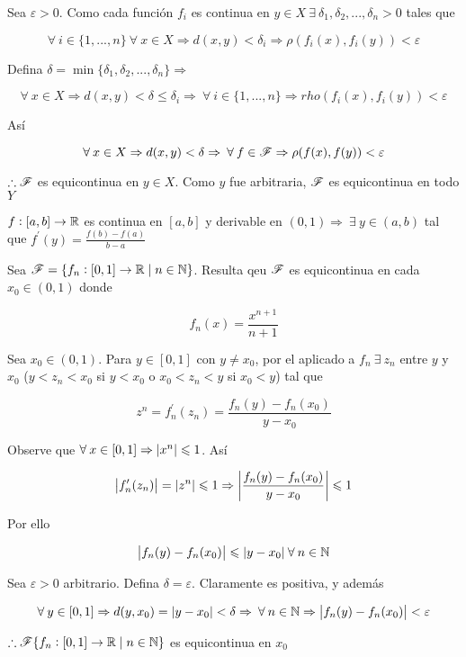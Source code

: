 \begin{proofexplanation}
    Sea $\varepsilon > 0$. Como cada función $f_i$ es continua en $ y \in X \: \exists \: \delta_1, \delta_2, ..., \delta_n > 0$ tales que

    $$\forall \: i \in \{ 1, ..., n \} \: \forall \: x \in X \Rightarrow d(x,y) < \delta_i \Rightarrow \rho(f_i(x),f_i(y)) < \varepsilon$$

    Defina $\delta = \min \{ \delta_1, \delta_2, ..., \delta_n \} \Rightarrow$

    $$\forall \: x \in X \Rightarrow d(x,y) < \delta \leqslant \delta_i \Rightarrow \: \forall \: i \in \{ 1, ..., n \} \Rightarrow rho(f_i(x),f_i(y)) < \varepsilon$$

    Así 

    $$\forall \: x \in X \Rightarrow d(x,y) < \delta \Rightarrow \: \forall \: f \in \mathscr{F} \Rightarrow \rho(f(x),f(y)) < \varepsilon$$

    $\therefore \mathscr{F}$ es equicontinua en $y \in X$. Como $y$ fue arbitraria, $\mathscr{F}$ es equicontinua en todo $Y$
\end{proofexplanation}

\begin{theorem}  \label{theomvm}
    $f: [a,b] \to \mathbb{R}$ es continua en $[a,b]$ y derivable en $(0,1) \Rightarrow \: \exists \: y \in (a,b)$ tal que ${f}^{\prime}(y) = \frac{f(b)-f(a)}{b-a}$
\end{theorem}

\begin{eg}
    Sea $\mathscr{F} = \{ f_n : [0,1] \to \mathbb{R} \mid n \in \mathbb{N} \}$. Resulta qeu $\mathscr{F}$ es equicontinua en cada $x_0 \in (0,1)$ donde 

    $$f_n(x) = \frac{{x}^{n+1}}{n+1}$$
\end{eg}


\begin{proofexplanation}
    Sea $x_0 \in (0,1)$. Para $y \in [0,1]$ con $y \neq x_0$, por el  aplicado a $f_n \: \exists \: z_n$ entre $y$ y $x_0$ ($y < z_n < x_0$ si $y < x_0$ o $x_0 < z_n < y$ si $x_0 < y$) tal que

    $$z^n = {f}_{n}^{\prime}(z_n) = \frac{f_n(y)-f_n(x_0)}{y-x_0}$$

    Observe que $\forall \: x \in [0,1] \Rightarrow \abs{x^n} \leqslant 1$. Así

    $$\abs{ {f}_{n}^{\prime}(z_n)} = \abs{z^n} \leqslant 1 \Rightarrow \abs{\frac{f_n(y)-f_n(x_0)}{y-x_0}} \leqslant 1$$

    Por ello

    $$\abs{f_n(y) - f_n(x_0)} \leqslant \abs{y-x_0} \: \forall \: n \in \mathbb{N}$$

    Sea $\varepsilon > 0$ arbitrario. Defina $\delta = \varepsilon$. Claramente es positiva, y además

    $$\forall \: y \in [0,1] \Rightarrow d(y,x_0) = \abs{y-x_0} < \delta \Rightarrow \: \forall \: n \in \mathbb{N} \Rightarrow  \abs{f_n(y) - f_n(x_0)} < \varepsilon$$

    $\therefore \mathscr{F}  \{ f_n : [0,1] \to \mathbb{R} \mid n \in \mathbb{N} \}$ es equicontinua en $x_0$
\end{proofexplanation}

